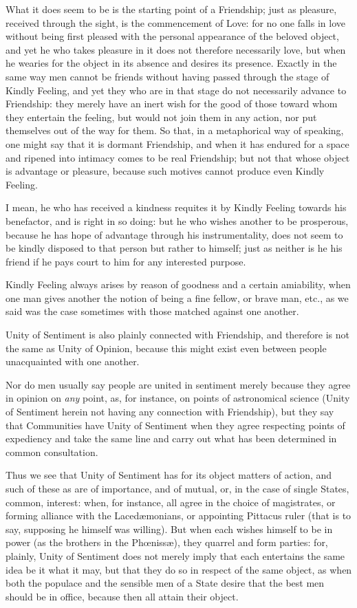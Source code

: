 What it does seem to be is the starting point of a Friendship; just as
pleasure, received through the sight, is the commencement of Love: for no one
falls in love without being first pleased with the personal appearance of the
beloved object, and yet he who takes pleasure in it does not therefore
necessarily love, but when he wearies for the object in its absence and desires
its presence. Exactly in the same way men cannot be friends without having
passed through the stage of Kindly Feeling, and yet they who are in that stage
do not necessarily advance to Friendship: they merely have an inert wish for
the good of those toward whom they entertain the feeling, but would not join
them in any action, nor put themselves out of the way for them. So that, in a
metaphorical way of speaking, one might say that it is dormant Friendship, and
when it has endured for a space and ripened into intimacy comes to be real
Friendship; but not that whose object is advantage or pleasure, because such
motives cannot produce even Kindly Feeling.

I mean, he who has received a kindness requites it by Kindly Feeling towards
his benefactor, and is right in so doing: but he who wishes another to be
prosperous, because he has hope of advantage through his instrumentality, does
not seem to be kindly disposed to that person but rather to himself; just as
neither is he his friend if he pays court to him for any interested purpose.

Kindly Feeling always arises by reason of goodness and a certain amiability,
when one man gives another the notion of being a fine fellow, or brave man,
etc., as we said was the case sometimes with those matched against one another.


Unity of Sentiment is also plainly connected with Friendship, and therefore is
not the same as Unity of Opinion, because this might exist even between people
unacquainted with one another.

Nor do men usually say people are united in sentiment merely because they agree
in opinion on \emph{any} point, as, for instance, on points of astronomical
science (Unity of Sentiment herein not having any connection with Friendship),
but they say that Communities have Unity of Sentiment when they agree
respecting points of expediency and take the same line and carry out what has
been determined in common consultation.

Thus we see that Unity of Sentiment has for its object matters of action, and
such of these as are of importance, and of mutual, or, in the case of single
States, common, interest: when, for instance, all agree in the choice of
magistrates, or forming alliance with the Lacedæmonians, or appointing Pittacus
ruler (that is to say, supposing he himself was willing). But when each wishes
himself to be in power (as the brothers in the Phœnissæ), they quarrel and form
parties: for, plainly, Unity of Sentiment does not merely imply that each
entertains the same idea be it what it may, but that they do so in respect of
the same object, as when both the populace and the sensible men of a State
desire that the best men should be in office, because then all attain their
object.

